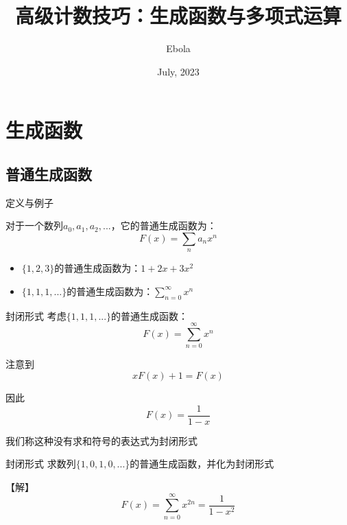 \documentclass{beamer}
\author{Ebola}
\title{高级计数技巧：生成函数与多项式运算}
\institute{
    Institute of Mathematics, \\
    Zhejiang University.
}
\date{July, 2023}
\begin{document}
\begin{frame}
    \titlepage
\end{frame}

\begin{frame}
    \tableofcontents[sectionstyle=show,subsectionstyle=show/shaded/hide,subsubsectionstyle=show/shaded/hide]
\end{frame}

\section{生成函数}

\subsection{普通生成函数}

\begin{frame}{定义与例子}

对于一个数列$a_0,a_1,a_2,...$，它的普通生成函数为：
\begin{equation*}
    F(x)=\sum_n a_nx^n
\end{equation*}

\pause
\begin{itemize}
    \item $\{1,2,3\}$的普通生成函数为：$1+2x+3x^2$
    \item $\{1,1,1,...\}$的普通生成函数为：$\sum_{n=0}^\infty x^n$
\end{itemize}

\end{frame}

\begin{frame}{封闭形式}
    考虑$\{1,1,1,...\}$的普通生成函数：
    \begin{equation*}
        F(x)=\sum_{n=0}^\infty x^n
    \end{equation*}

    \pause
    注意到
    \begin{equation*}
        xF(x)+1=F(x)
    \end{equation*}

    因此
    \begin{equation*}
        F(x)=\frac{1}{1-x}
    \end{equation*}

    我们称这种没有求和符号的表达式为封闭形式
\end{frame}

\begin{frame}{封闭形式}
    求数列$\{1,0,1,0,...\}$的普通生成函数，并化为封闭形式

    \vspace{1em}\pause
    【解】
    \begin{equation*}
        F(x)=\sum_{n=0}^\infty x^{2n}=\frac{1}{1-x^2}
    \end{equation*}
\end{frame}
\end{document}
